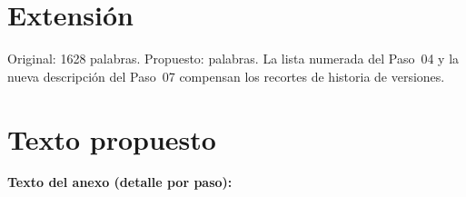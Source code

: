 \section{Extensión}

Original: 1628 palabras. Propuesto: palabras. La lista numerada del Paso~04 y la nueva descripción del Paso~07 compensan los recortes de historia de versiones.

\section{Texto propuesto}

\begin{propuesto}


\medskip\noindent\textbf{Texto del anexo (detalle por paso):}


\end{propuesto}


